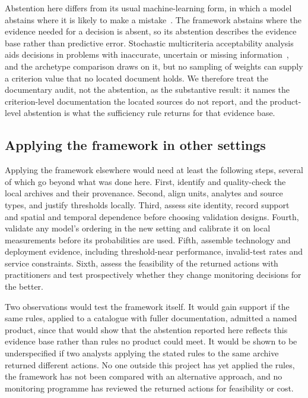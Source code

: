 \documentclass[10pt,letterpaper]{article}
\begin{document}
Abstention here differs from its usual machine-learning form, in which a model abstains where it is likely to make a mistake~\cite{Hendrickx2024}. The framework abstains where the evidence needed for a decision is absent, so its abstention describes the evidence base rather than predictive error. Stochastic multicriteria acceptability analysis aids decisions in problems with inaccurate, uncertain or missing information~\cite{TervonenLahdelma2007}, and the archetype comparison draws on it, but no sampling of weights can supply a criterion value that no located document holds. We therefore treat the documentary audit, not the abstention, as the substantive result: it names the criterion-level documentation the located sources do not report, and the product-level abstention is what the sufficiency rule returns for that evidence base.

\subsection*{Applying the framework in other settings}

Applying the framework elsewhere would need at least the following steps, several of which go beyond what was done here. First, identify and quality-check the local archives and their provenance. Second, align units, analytes and source types, and justify thresholds locally. Third, assess site identity, record support and spatial and temporal dependence before choosing validation designs. Fourth, validate any model's ordering in the new setting and calibrate it on local measurements before its probabilities are used. Fifth, assemble technology and deployment evidence, including threshold-near performance, invalid-test rates and service constraints. Sixth, assess the feasibility of the returned actions with practitioners and test prospectively whether they change monitoring decisions for the better.

Two observations would test the framework itself. It would gain support if the same rules, applied to a catalogue with fuller documentation, admitted a named product, since that would show that the abstention reported here reflects this evidence base rather than rules no product could meet. It would be shown to be underspecified if two analysts applying the stated rules to the same archive returned different actions. No one outside this project has yet applied the rules, the framework has not been compared with an alternative approach, and no monitoring programme has reviewed the returned actions for feasibility or cost.
\end{document}
